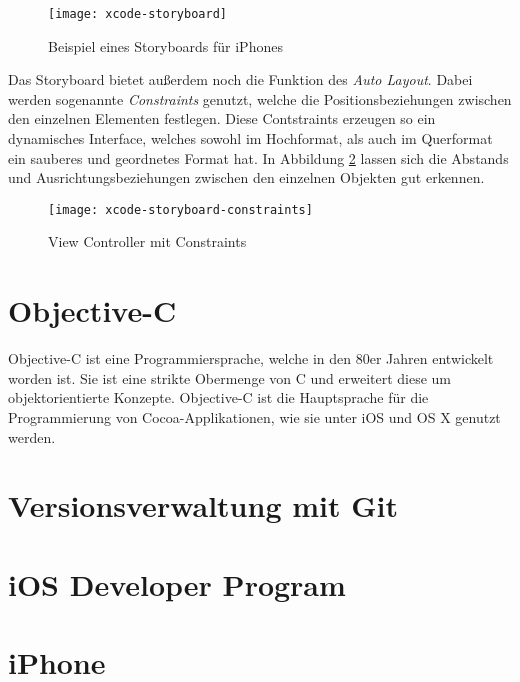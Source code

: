 \begin{figure}[htb!]
	\centering
	\texttt{[image: xcode-storyboard]}
	\caption{Beispiel eines Storyboards für iPhones}
	\label{xcode-storyboard}
\end{figure}

Das Storyboard bietet außerdem noch die Funktion des \emph{Auto Layout}. Dabei werden sogenannte \emph{Constraints} genutzt, welche die Positionsbeziehungen zwischen den einzelnen Elementen festlegen. Diese Contstraints erzeugen so ein dynamisches Interface, welches sowohl im Hochformat, als auch im Querformat ein sauberes und geordnetes Format hat.
In Abbildung \ref{xcode-storyboard-constraints} lassen sich die Abstands und Ausrichtungsbeziehungen zwischen den einzelnen Objekten gut erkennen.

\begin{figure}[htb!]
		\centering
	\texttt{[image: xcode-storyboard-constraints]}
	\caption{View Controller mit Constraints}
	\label{xcode-storyboard-constraints}
\end{figure}

\section{Objective-C}
\label{sec:tools:objectivec}
Objective-C ist eine Programmiersprache, welche in den 80er Jahren entwickelt worden ist. Sie ist eine strikte Obermenge von C und erweitert diese um objektorientierte Konzepte. Objective-C ist die Hauptsprache für die Programmierung von Cocoa-Applikationen, wie sie unter iOS und OS X genutzt werden.



\section{Versionsverwaltung mit Git}
\label{sec:tools:git}

\section{iOS Developer Program}
\label{sec:iosdevprogram}

\section{iPhone}
\label{sec:tools:iphone}
